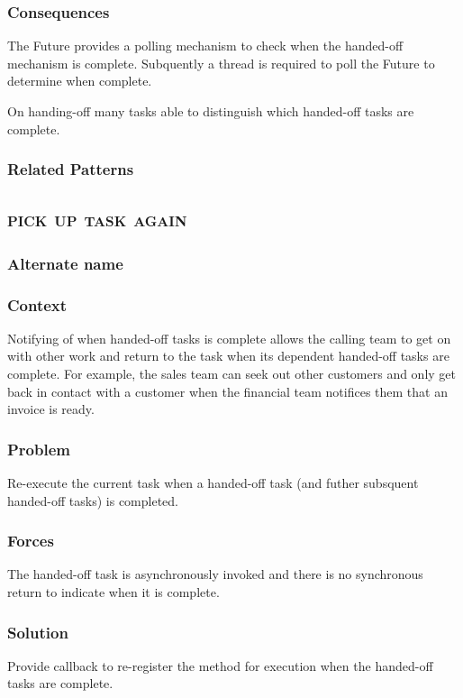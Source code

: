 \documentclass[prodmode]{style/acmlarge}
\begin{document}
\subsubsection*{Consequences} The Future provides a polling mechanism to check
when the handed-off mechanism is complete.  Subquently a thread is required to
poll the Future to determine when complete.

On handing-off many tasks able to distinguish which handed-off tasks are
complete.

\subsubsection*{Related Patterns}



\subsection{\textsc{\textbf{pick up task again}}}

\subsubsection*{Alternate name}

\subsubsection*{Context} Notifying of when handed-off tasks is complete allows
the calling team to get on with other work and return to the task when its
dependent handed-off tasks are complete.  For example, the sales team can seek
out other customers and only get back in contact with a customer when the
financial team notifices them that an invoice is ready.

\subsubsection*{Problem} Re-execute the current task when a handed-off task (and
futher subsquent handed-off tasks) is completed.

\subsubsection*{Forces} The handed-off task is asynchronously invoked and there is
no synchronous return to indicate when it is complete.

\subsubsection*{Solution} Provide callback to re-register the method for
execution when the handed-off tasks are complete.
\end{document}
